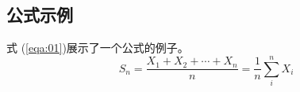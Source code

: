 \documentclass[a4paper,11pt,UTF8]{ctexart}
\begin{document}
\begin{appendix}
\section{公式示例}
式 (\ref{eqa:01})展示了一个公式的例子。
\begin{equation}
S_n = \frac{X_1 + X_2 + \cdots + X_n}{n}
      = \frac{1}{n}\sum_{i}^{n} X_i
\label{eqa:01}
\end{equation}




\end{appendix}
\end{document}
